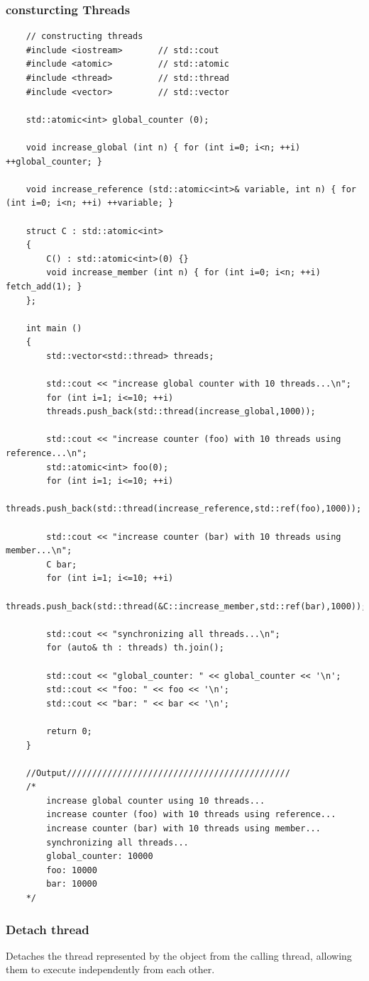 \documentclass[UTF8,a4paper,12pt]{ctexbook}
\begin{document}
		\subsubsection{consturcting Threads}
\begin{lstlisting}
	// constructing threads
	#include <iostream>       // std::cout
	#include <atomic>         // std::atomic
	#include <thread>         // std::thread
	#include <vector>         // std::vector
	
	std::atomic<int> global_counter (0);
	
	void increase_global (int n) { for (int i=0; i<n; ++i) ++global_counter; }
	
	void increase_reference (std::atomic<int>& variable, int n) { for (int i=0; i<n; ++i) ++variable; }
	
	struct C : std::atomic<int> 
	{
		C() : std::atomic<int>(0) {}
		void increase_member (int n) { for (int i=0; i<n; ++i) fetch_add(1); }
	};
	
	int main ()
	{
		std::vector<std::thread> threads;
		
		std::cout << "increase global counter with 10 threads...\n";
		for (int i=1; i<=10; ++i)
		threads.push_back(std::thread(increase_global,1000));
		
		std::cout << "increase counter (foo) with 10 threads using reference...\n";
		std::atomic<int> foo(0);
		for (int i=1; i<=10; ++i)
			threads.push_back(std::thread(increase_reference,std::ref(foo),1000));
		
		std::cout << "increase counter (bar) with 10 threads using member...\n";
		C bar;
		for (int i=1; i<=10; ++i)
			threads.push_back(std::thread(&C::increase_member,std::ref(bar),1000));
		
		std::cout << "synchronizing all threads...\n";
		for (auto& th : threads) th.join();
		
		std::cout << "global_counter: " << global_counter << '\n';
		std::cout << "foo: " << foo << '\n';
		std::cout << "bar: " << bar << '\n';
		
		return 0;
	}
	
	//Output////////////////////////////////////////////
	/*
		increase global counter using 10 threads...
		increase counter (foo) with 10 threads using reference...
		increase counter (bar) with 10 threads using member...
		synchronizing all threads...
		global_counter: 10000
		foo: 10000
		bar: 10000
	*/
\end{lstlisting}
		\subsubsection{Detach thread}Detaches the thread represented by the object from the calling thread, allowing them to execute independently from each other.
		
\end{document}
